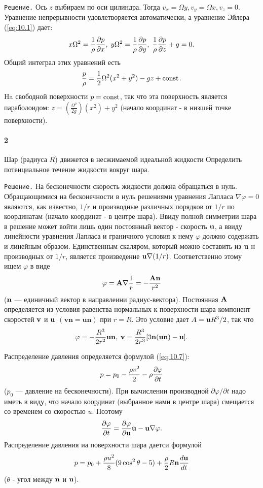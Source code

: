 \texttt{Решение.} Ось $z$ выбираем по оси цилиндра. Тогда
$v_x=\Omega y, v_y=\Omega x, v_z = 0$. Уравнение непрерывности удовлетворяется
автоматически, а уравнение Эйлера (\ref{eq:10.1}) дает:
\[
   x\Omega^2 = \frac1{\rho}\frac{\partial{p}}{\partial{x}},\;
   y\Omega^2 = \frac1{\rho}\frac{\partial{p}}{\partial{y}},\;
   \frac1{\rho}\frac{\partial{p}}{\partial{z}} + g = 0.
\]Общий интеграл этих уравнений есть
\[
   \frac{p}{\rho} = \frac{1}{2}\Omega^2(x^2+y^2) - gz + \mathop{\mathrm{const}}\nolimits.
\]
Ha свободной поверхности $p=\mathop{\mathrm{const}}\nolimits$, так что эта поверхность является
параболоидом: $z = \left(\frac{\Omega^2}{2g}\right)(x^2)+y^2$
(начало координат - в низшей точке поверхности).

\paragraph*{2}  Шар (радиуса $R$) движется в несжимаемой идеальной жидкости
Определить потенциальное течение жидкости вокруг шара.

\texttt{Решение.} На бесконечности скорость жидкости должна обращаться в нуль.
Обращающимися на бесконечности в нуль решениями уравнения Лапласа $\nabla
\varphi = 0$ являются, как известно, $1/r$ и производные различных порядков от
$1/r$ по координатам (начало координат - в центре шара). Ввиду полной симметрии
шара в решение может войти лишь один постоянный вектор - скорость $\mathbf{u}$, а
ввиду линейности уравнения Лапласа и граничного условия к нему $\varphi$ должно
содержать и линейным образом. Единственным скаляром, который можно составить из
$\mathbf{u}$ н производных от $1/r$, является произведение $\mathbf{u} \nabla(1/r)$.
Соответственно этому ищем $\varphi$ в виде
\[
   \varphi = \mathbf{A} \nabla \frac1{r} = - \frac{\mathbf{A} \mathbf{n}}{r^2}
\]
($\mathbf{n}$ — единичный вектор в направлеини радиус-вектора). Постоянная
$\mathbf{A}$ определяется из условия равенства нормальных к поверхности шара
компонент скоростей $\mathbf{v}$ и $\mathbf{u}$ $(\mathbf{vn = un})$  при $r=R$.
Это условие дает $A=\mathbf{u} R^3/2$, так что
\[
   \varphi = - \frac{R^3}{2r^2}\mathbf{un},\;
   \mathbf{v} = \frac{R^3}{2r^3}\lbrack 3\mathbf{n(un)-u}\rbrack.
\]

Распределение давления определяется формулой (\ref{eq:10.7}):
\[
   p = p_0 - \frac{\rho v^2}{2} - \rho \frac{\partial{\varphi}}{\partial{t}}
\]
($p_0$ — давление на бесконечности). При вычислении производной
$\partial \varphi/\partial t$ надо иметь в виду, что начало координат
(выбранное нами в центре шара) смещается со временем со скоростью $u$. Поэтому
\[
   \frac{\partial{\varphi}}{\partial{t}} = \frac{\partial{\varphi}}{\partial{ \mathbf{u} }}\dot{\mathbf{u}} - \mathbf{u} \nabla \varphi.
\]
Распределение давления иа поверхности шара даетси формулой
\[
   p = p_0 + \frac{\rho u^2}{8}(9\cos^2\theta - 5) + \frac{\rho}{2}R\mathbf{n} \frac{d{\mathbf{u}}}{d{t}}
\]
($\theta$ - угол между $\mathbf{n}$ и $\mathbf{u}$).

